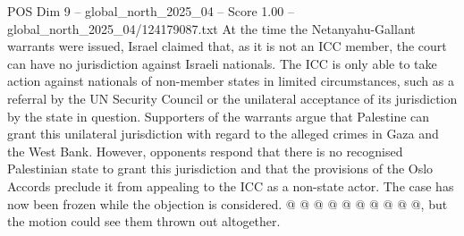 \begin{textsample}{POS Dim 9 – global\_north\_2025\_04 – Score 1.00 – global\_north\_2025\_04/124179087.txt}
At the time the Netanyahu-Gallant warrants were issued, Israel claimed that, as it is not an ICC member, the court can have no jurisdiction against Israeli nationals.
The ICC is only able to take action against nationals of non-member states in limited circumstances, such as a referral by the UN Security Council or the unilateral acceptance of its jurisdiction by the state in question.
Supporters of the warrants argue that Palestine can grant this unilateral jurisdiction with regard to the alleged crimes in Gaza and the West Bank.
However, opponents respond that there is no recognised Palestinian state to grant this jurisdiction and that the provisions of the Oslo Accords preclude it from appealing to the ICC as a non-state actor.
The case has now been frozen while the objection is considered. @ @ @ @ @ @ @ @ @ @, but the motion could see them thrown out altogether.

\end{textsample}

